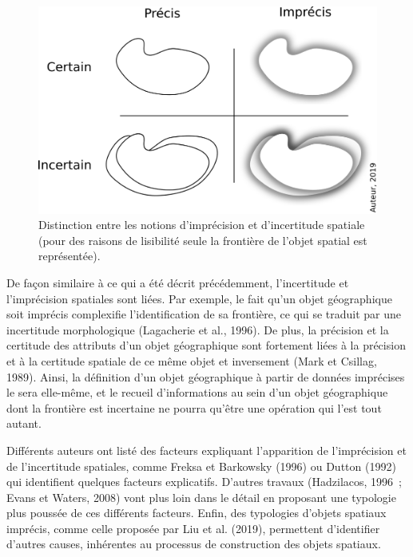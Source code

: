 \begin{figure}
  \centering
  \includegraphics{../figures/fig5.png}
  \caption{Distinction entre les notions d’imprécision et
    d'incertitude spatiale (pour des raisons de lisibilité seule la
    frontière de l’objet spatial est représentée).}
  \label{fig:inc_vs_imp}
\end{figure}

De façon similaire à ce qui a été décrit précédemment, l’incertitude
et l’imprécision spatiales sont liées. Par exemple, le fait qu’un
objet géographique soit imprécis complexifie l’identification de sa
frontière, ce qui se traduit par une incertitude morphologique
(Lagacherie et al., 1996). De plus, la précision et la certitude des
attributs d’un objet géographique sont fortement liées à la précision
et à la certitude spatiale de ce même objet et inversement (Mark et
Csillag, 1989). Ainsi, la définition d’un objet géographique à partir
de données imprécises le sera elle-même, et le recueil d’informations
au sein d’un objet géographique dont la frontière est incertaine ne
pourra qu’être une opération qui l’est tout autant.

Différents auteurs ont listé des facteurs expliquant l’apparition de
l’imprécision et de l’incertitude spatiales, comme Freksa et Barkowsky
(1996) ou Dutton (1992) qui identifient quelques facteurs
explicatifs. D’autres travaux (Hadzilacos, 1996 ; Evans et Waters,
2008) vont plus loin dans le détail en proposant une typologie plus
poussée de ces différents facteurs. Enfin, des typologies d’objets
spatiaux imprécis, comme celle proposée par Liu et al. (2019),
permettent d’identifier d’autres causes, inhérentes au processus de
construction des objets spatiaux.

